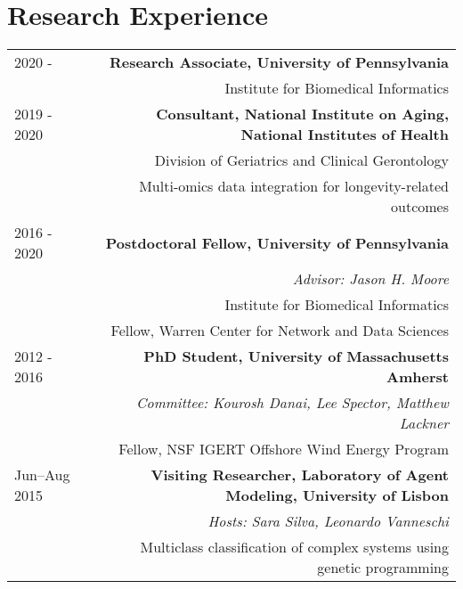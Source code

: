 \section*{Research Experience}

\begin{tabular}{L!{\VRule}R}
2020 - & {\bf Research Associate,  University of Pennsylvania} \\
& Institute for Biomedical Informatics \\
2019 - 2020  & {\bf Consultant, National Institute on Aging, National Institutes of Health} \\
& Division of Geriatrics and Clinical Gerontology \\
& Multi-omics data integration for longevity-related outcomes\\
2016 - 2020 & {\bf Postdoctoral Fellow, University of Pennsylvania} \\
& {\it Advisor: Jason H. Moore} \\
& Institute for Biomedical Informatics \\
& Fellow, Warren Center for Network and Data Sciences \\
2012 - 2016 & {\bf PhD Student, University of Massachusetts Amherst} \\
& {\it Committee: Kourosh Danai, Lee Spector, Matthew Lackner} \\
& Fellow, NSF IGERT Offshore Wind Energy Program \\
Jun--Aug 2015& {\bf Visiting Researcher, Laboratory of Agent Modeling, University of Lisbon} \\
&{\it Hosts: Sara Silva, Leonardo Vanneschi} \\
& Multiclass classification of complex systems using genetic programming \\

\end{tabular}
